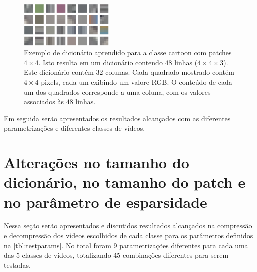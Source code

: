 \documentclass[cic,tc]{iiufrgs}
\begin{document}
\begin{figure}[H]
    \caption{Exemplo de dicionário aprendido para a classe cartoon com patches $4\times4$. 
    Isto resulta em um dicionário contendo $48$ linhas ($4\times4\times3$). 
    Este dicionário contém $32$ colunas. 
    Cada quadrado mostrado contém $4\times4$ pixels, 
    cada um exibindo um valore RGB.
    O conteúdo de cada um dos quadrados corresponde a uma coluna, com os valores 
    associados às $48$ linhas.}
    \begin{center}
           \includegraphics[width=0.4\textwidth]{img/indoor_p4_d32.png}
    \end{center}
    \label{fig:dicip4d32}
\end{figure}


Em seguida serão apresentados os resultados alcançados com as diferentes parametrizações 
e diferentes classes de vídeos.

\section{Alterações no tamanho do dicionário, no tamanho do patch e no parâmetro de esparsidade}
\label{sec:parametrizacao}
Nessa seção serão apresentados e discutidos resultados alcançados na compressão e 
decompressão dos vídeos escolhidos de cada classe para os parâmetros definidos na 
\autoref{tbl:testparams}.
No total foram 9 parametrizações diferentes para cada uma das 5 classes de vídeos, 
totalizando 45 combinações diferentes para serem testadas.
\end{document}
